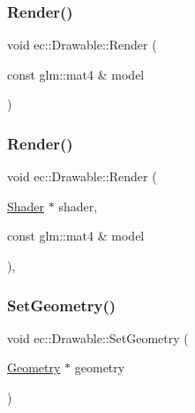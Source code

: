 \mbox{\label{classec_1_1_drawable_a596e416058e038df99a57f30724f6d38}} 
\subsubsection{\texorpdfstring{Render()}{Render()}\hspace{0.1cm}{\footnotesize\ttfamily [1/2]}}
{\footnotesize\ttfamily void ec\+::\+Drawable\+::\+Render (\begin{DoxyParamCaption}\item[{const glm\+::mat4 \&}]{model }\end{DoxyParamCaption})\hspace{0.3cm}{\ttfamily [virtual]}}

\mbox{\label{classec_1_1_drawable_a133db2c710255113cd357869a1a7912e}} 
\subsubsection{\texorpdfstring{Render()}{Render()}\hspace{0.1cm}{\footnotesize\ttfamily [2/2]}}
{\footnotesize\ttfamily void ec\+::\+Drawable\+::\+Render (\begin{DoxyParamCaption}\item[{\mbox{\hyperlink{classec_1_1_shader}{Shader}} $\ast$}]{shader,  }\item[{const glm\+::mat4 \&}]{model }\end{DoxyParamCaption})\hspace{0.3cm}{\ttfamily [protected]}, {\ttfamily [virtual]}}

\mbox{\label{classec_1_1_drawable_a27f372e03e7cd5fb5e69316aee8c7e6b}} 
\subsubsection{\texorpdfstring{Set\+Geometry()}{SetGeometry()}}
{\footnotesize\ttfamily void ec\+::\+Drawable\+::\+Set\+Geometry (\begin{DoxyParamCaption}\item[{\mbox{\hyperlink{classec_1_1_geometry}{Geometry}} $\ast$}]{geometry }\end{DoxyParamCaption})}

